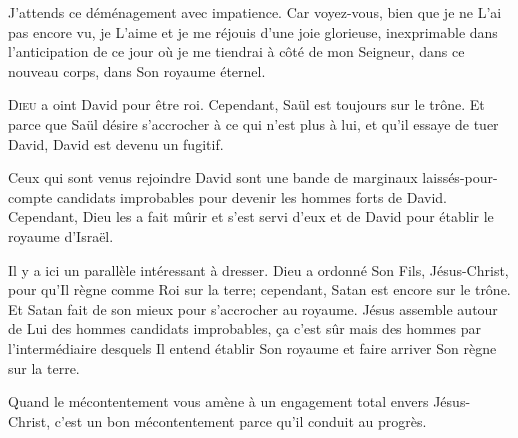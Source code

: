 J'attends ce déménagement avec impatience.
 Car voyez-vous, bien que je ne L'ai pas encore vu,
 je L'aime et je me réjouis d'une joie glorieuse,
 inexprimable dans l'anticipation de ce jour où je me tiendrai
 à côté de mon Seigneur, dans ce nouveau corps, dans Son royaume éternel. 

\dvrule






\lettrine{D}{ieu} a oint David pour être roi.
 Cependant, Saül est toujours sur le trône.
 Et parce que Saül désire s'accrocher à ce qui n'est plus à lui,
 et qu'il essaye de tuer David, David est devenu un fugitif.

Ceux qui sont venus rejoindre David sont une bande de marginaux
 laissés-pour-compte \ocadr candidats improbables pour devenir
 les hommes forts de David.
 Cependant, Dieu les a fait mûrir et s'est servi d'eux
 et de David pour établir le royaume d'Israël.

Il y a ici un parallèle intéressant à dresser.
 Dieu a ordonné Son Fils, Jésus-Christ, pour qu'Il règne comme Roi sur la terre;
 cependant, Satan est encore sur le trône.
 Et Satan fait de son mieux pour s'accrocher au royaume.
 Jésus assemble autour de Lui des hommes
 \ocadr candidats improbables, \c{c}a c'est sûr \fcadr
 mais des hommes par l'intermédiaire desquels Il entend établir Son royaume
 et faire arriver Son règne sur la terre.


Quand le mécontentement vous amène à un engagement total envers Jésus-Christ,
 c'est un bon mécontentement parce qu'il conduit au progrès. 

\dvrule



